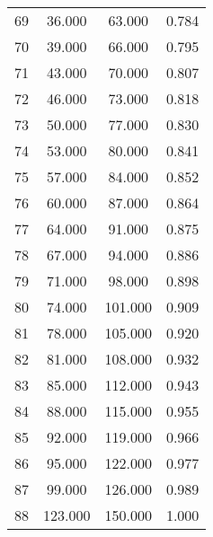 \begin{tabular}{cccc}
  69 & 36.000 & 63.000 & 0.784 \\ 
  70 & 39.000 & 66.000 & 0.795 \\ 
  71 & 43.000 & 70.000 & 0.807 \\ 
  72 & 46.000 & 73.000 & 0.818 \\ 
  73 & 50.000 & 77.000 & 0.830 \\ 
  74 & 53.000 & 80.000 & 0.841 \\ 
  75 & 57.000 & 84.000 & 0.852 \\ 
  76 & 60.000 & 87.000 & 0.864 \\ 
  77 & 64.000 & 91.000 & 0.875 \\ 
  78 & 67.000 & 94.000 & 0.886 \\ 
  79 & 71.000 & 98.000 & 0.898 \\ 
  80 & 74.000 & 101.000 & 0.909 \\ 
  81 & 78.000 & 105.000 & 0.920 \\ 
  82 & 81.000 & 108.000 & 0.932 \\ 
  83 & 85.000 & 112.000 & 0.943 \\ 
  84 & 88.000 & 115.000 & 0.955 \\ 
  85 & 92.000 & 119.000 & 0.966 \\ 
  86 & 95.000 & 122.000 & 0.977 \\ 
  87 & 99.000 & 126.000 & 0.989 \\ 
  88 & 123.000 & 150.000 & 1.000 \\ 
   \hline
\end{tabular}
